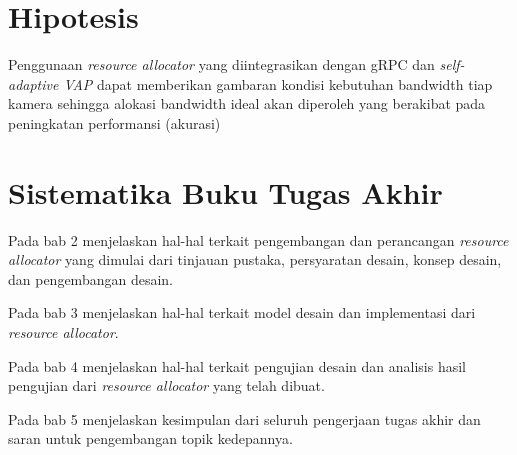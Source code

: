 \section{Hipotesis}



Penggunaan \textit{resource allocator} yang diintegrasikan dengan gRPC dan \textit{self-adaptive VAP} dapat memberikan gambaran kondisi kebutuhan bandwidth
tiap kamera sehingga alokasi bandwidth ideal akan diperoleh yang berakibat pada peningkatan performansi (akurasi)

\section{Sistematika Buku Tugas Akhir}

Pada bab 2 menjelaskan hal-hal terkait pengembangan dan perancangan \textit{resource allocator} yang dimulai dari tinjauan pustaka, persyaratan desain, konsep desain, dan pengembangan desain.

Pada bab 3 menjelaskan hal-hal terkait model desain dan implementasi dari \textit{resource allocator}.

Pada bab 4 menjelaskan hal-hal terkait pengujian desain dan analisis hasil pengujian dari \textit{resource allocator} yang telah dibuat. 

Pada bab 5 menjelaskan kesimpulan dari seluruh pengerjaan tugas akhir dan saran untuk pengembangan topik kedepannya.



